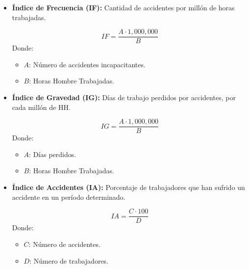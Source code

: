 \documentclass{article} %
\begin{document}
\begin{itemize}[label={},left=0pt,align=parleft]
    \item \begin{highlightbox}[levelone] \textbf{Índice de Frecuencia (IF):} Cantidad de accidentes por millón de horas trabajadas. \end{highlightbox}
    \[
    IF = \frac{A \cdot 1,000,000}{B}
    \]
    Donde:
    \begin{itemize}[label={},left=1em,align=parleft]
        \item \begin{highlightbox}[leveltwo] $A$: Número de accidentes incapacitantes. \end{highlightbox}
        \item \begin{highlightbox}[leveltwo] $B$: Horas Hombre Trabajadas. \end{highlightbox}
    \end{itemize}
    
    \item \begin{highlightbox}[levelone] \textbf{Índice de Gravedad (IG):} Días de trabajo perdidos por accidentes, por cada millón de HH. \end{highlightbox}
    \[
    IG = \frac{A \cdot 1,000,000}{B}
    \]
    Donde:
    \begin{itemize}[label={},left=1em,align=parleft]
        \item \begin{highlightbox}[leveltwo] $A$: Días perdidos. \end{highlightbox}
        \item \begin{highlightbox}[leveltwo] $B$: Horas Hombre Trabajadas. \end{highlightbox}
    \end{itemize}
    
    \item \begin{highlightbox}[levelone] \textbf{Índice de Accidentes (IA):} Porcentaje de trabajadores que han sufrido un accidente en un período determinado. \end{highlightbox}
    \[
    IA = \frac{C \cdot 100}{D}
    \]
    Donde:
    \begin{itemize}[label={},left=1em,align=parleft]
        \item \begin{highlightbox}[leveltwo] $C$: Número de accidentes. \end{highlightbox}
        \item \begin{highlightbox}[leveltwo] $D$: Número de trabajadores. \end{highlightbox}
    \end{itemize}
\end{itemize}
\end{document}
